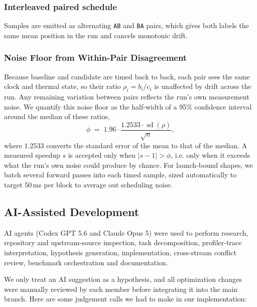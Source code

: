 \documentclass[10pt,conference,compsoc]{IEEEtran}
\begin{document}
\subsubsection{Interleaved paired schedule}
Samples are emitted as alternating \texttt{AB} and \texttt{BA} pairs, which gives both labels the same mean position in the run and cancels monotonic drift.

\subsubsection{Noise Floor from Within-Pair Disagreement}
Because baseline and candidate are timed back to back, each pair sees the same clock and thermal state, so their ratio $\rho_i = b_i / c_i$ is unaffected by drift across the run. Any remaining variation between pairs reflects the run's own measurement noise. We quantify this noise floor as the half-width of a 95\% confidence interval around the median of these ratios,
\begin{equation}
\phi \;=\; 1.96 \cdot \frac{1.2533 \cdot \operatorname{sd}(\rho)}{\sqrt{n}} ,
\label{eq:noise}
\end{equation}
where $1.2533$ converts the standard error of the mean to that of the median. A measured speedup $s$ is accepted only when $\lvert s - 1 \rvert > \phi$, i.e. only when it exceeds what the run's own noise could produce by chance. For launch-bound shapes, we batch several forward passes into each timed sample, sized automatically to target 50\,ms per block to average out scheduling noise.

\subsection{AI-Assisted Development}
\label{sec:ai}
AI agents (Codex GPT 5.6 and Claude Opus 5) were used to perform research, repository and upstream-source inspection, task decomposition, profiler-trace interpretation, hypothesis generation, implementation, cross-stream conflict review, benchmark orchestration and documentation.

We only treat an AI suggestion as a hypothesis, and all optimization changes were manually reviewed by each member before integrating it into the main branch. Here are some judgement calls we had to make in our implementation:
\end{document}
